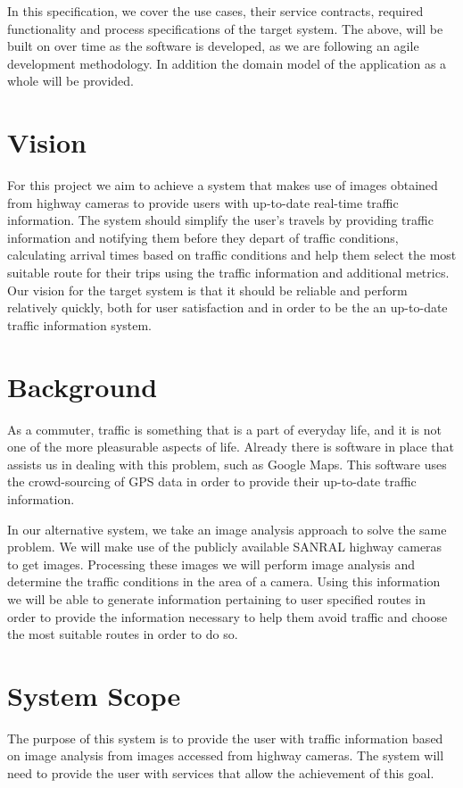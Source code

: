 \documentclass[a4paper,12pt]{article}
\begin{document}
In this specification, we cover the use cases, their service contracts, required functionality and process specifications of the target system. The above, will be built on over time as the software is developed, as we are following an agile development methodology. In addition the domain model of the application as a whole will be provided.
\section{Vision}
For this project we aim to achieve a system that makes use of images obtained from highway cameras to provide users with up-to-date real-time traffic information. The system should simplify the user's travels by providing traffic information and notifying them before they depart of traffic conditions, calculating arrival times based on traffic conditions and help them select the most suitable route for their trips using the traffic information and additional metrics. Our vision for the target system is that it should be reliable and perform relatively quickly, both for user satisfaction and in order to be the an up-to-date traffic information system.
\section{Background}
As a commuter, traffic is something that is a part of everyday life, and it is not one of the more pleasurable aspects of life. Already there is software in place that assists us in dealing with this problem, such as Google Maps. This software uses the crowd-sourcing of GPS data in order to provide their up-to-date traffic information.

In our alternative system, we take an image analysis approach to solve the same problem. We will make use of the publicly available SANRAL highway cameras to get images. Processing these images we will perform image analysis and determine the traffic conditions in the area of a camera. Using this information we will be able to generate information pertaining to user specified routes in order to provide the information necessary to help them avoid traffic and choose the most suitable routes in order to do so.
\section{System Scope}
The purpose of this system is to provide the user with traffic information based on image analysis from images accessed from highway cameras. The system will need to provide the user with services that allow the achievement of this goal.
\end{document}
